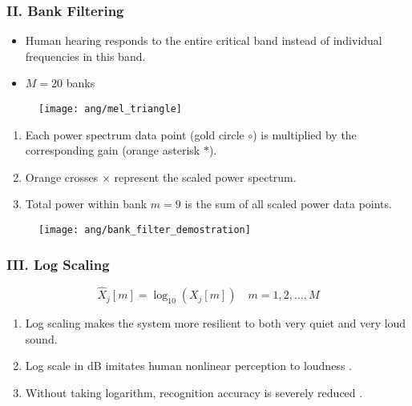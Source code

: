 
\begin{frame}
\frametitle{II. Bank Filtering}
\begin{itemize}
	\item Human hearing responds to the entire critical band instead of individual frequencies in this band.
	\item $M = 20$ banks
\end{itemize}

\begin{figure}[H]
\centering
\texttt{[image: ang/mel\_triangle]}
\end{figure}
\end{frame}


\begin{frame}
\begin{enumerate}
\item Each power spectrum data point (\textcolor{gold_matlab}{gold circle $\circ$}) is multiplied by the corresponding gain (\textcolor{orange_matlab}{orange asterisk $*$}).
\item \textcolor{orange_matlab}{Orange crosses $\times$} represent the scaled power spectrum.
\item Total power within bank $m=9$ is the sum of all scaled power data points.
\end{enumerate}

\begin{figure}[H]
\centering
\texttt{[image: ang/bank\_filter\_demostration]}
\end{figure}
\end{frame}


\begin{frame}
\frametitle{III. Log Scaling}
\begin{equation}
\hat{X}_j[m] = \log_{10}(X_j[m]) \quad m = 1, 2, \dots, M
\end{equation}

\begin{enumerate}
\item Log scaling makes the system more resilient to both very quiet and very loud sound.
\item Log scale in dB imitates human nonlinear perception to loudness \cite{farin2008mathematical}.
\item Without taking logarithm, recognition accuracy is severely reduced \cite{tan2008automatic}.
\end{enumerate}
\end{frame}

